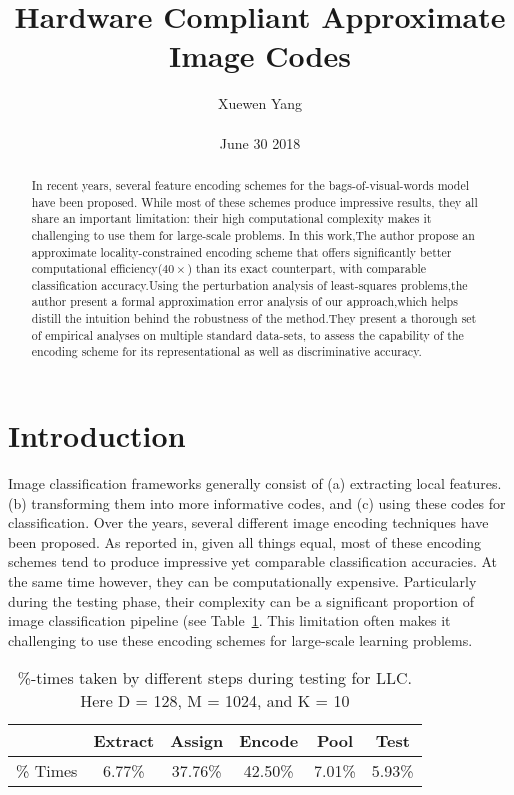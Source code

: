 \documentclass[10pt,twocolumn,letterpaper]{article}
\author{Xuewen Yang\\\\
June 30 2018}
\title{Hardware Compliant Approximate Image Codes}
\begin{document}
\maketitle
\begin{abstract}
In recent years, several feature encoding schemes for the bags-of-visual-words model have been proposed. While most of these schemes produce impressive results, they all share an important limitation: their high computational complexity makes it challenging to use them for large-scale problems. In this work,The author propose an approximate locality-constrained encoding scheme that offers significantly better computational efficiency($40\times$) than its exact counterpart, with comparable classification accuracy.Using the perturbation analysis of least-squares problems,the author present a formal approximation error analysis of our approach,which helps distill the intuition behind the robustness of the method.They present a thorough set of empirical analyses on multiple standard data-sets, to assess the capability of the encoding scheme for its representational as well as discriminative accuracy.
\end{abstract}
\section{Introduction}
Image classification frameworks generally consist of (a) extracting local features.(b) transforming them into more informative codes, and (c) using these codes for classification. Over the years, several different image encoding techniques have been proposed\cite{Wang2010Locality}\cite{Gemert2008Kernel}\cite{Wang2010Locality}\cite{Perronnin2010Improving}. As reported in\cite{Chatfield2011The}, given all things equal, most of these encoding schemes tend to produce impressive yet comparable classification accuracies. At the same time however, they can be computationally expensive\cite{Chatfield2011The}. Particularly during the testing phase, their complexity can be a significant proportion of image classification pipeline (see Table~\ref{tab:1}. This limitation often makes it challenging to use these encoding schemes for large-scale learning problems.
\begin{table}[bp]
\centering
\begin{tabular}{|l|c|c|c|c|c|}
\hline
      &Extract &Assign  &Encode &Pool &Test\\
\hline
\% Times &6.77\% &37.76\% &42.50\% &7.01\% &5.93\% \\
\hline
\end{tabular}
\caption{\%-times taken by different steps during testing for LLC\cite{Wang2010Locality}. Here D = 128, M = 1024, and K = 10}
\label{tab:1}
\end{table}
\end{document}
